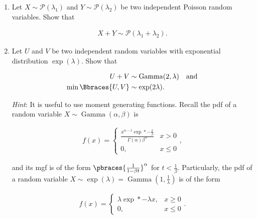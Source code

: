 
\begin{exercise}

\phantom{}

\begin{enumerate}[label = (\alph*)]

    \item Let $X \sim \mathcal P(\lambda_1)$ and $Y \sim \mathcal P(\lambda_2)$ be two independent Poisson random variables.
    Show that

    \begin{align*}
        X + Y \sim \mathcal P(\lambda_1 + \lambda_2).
    \end{align*}

    \item Let $U$ and $V$ be two independent random variables with exponential distribution $\exp(\lambda)$.
    Show that

    \begin{align*}
        U + V
        & \sim
        \operatorname{Gamma}(2, \lambda) \quad \text{and} \\
        \min \Bbraces{U, V}
        & \sim
        \exp(2 \lambda).
    \end{align*}

    \textit{Hint}:
    It is useful to use moment generating functions.
    Recall the pdf of a random variable $X \sim \operatorname{Gamma}(\alpha, \beta)$ is

    \begin{align*}
        f(x)
        =
        \begin{cases}
            \frac{x^{\alpha - 1} \exp*{-\frac{x}{\beta}}}{\Gamma(\alpha) \beta^\alpha}
            & x > 0 \\
            0,
            & x \leq 0
        \end{cases},
    \end{align*}
    
    and its mgf is of the form $\pbraces{\frac{1}{1 - \beta t}}^\alpha$ for $t < \frac{1}{\beta}$.
    Particularly, the pdf of a random variable $X \sim \exp(\lambda) = \operatorname{Gamma}(1, \frac{1}{\lambda})$ is of the form

    \begin{align*}
        f(x)
        =
        \begin{cases}
            \lambda \exp*{-\lambda x},
            & x \geq 0 \\
            0,
            & x \leq 0
        \end{cases}.
    \end{align*}

\end{enumerate}

\end{exercise}

